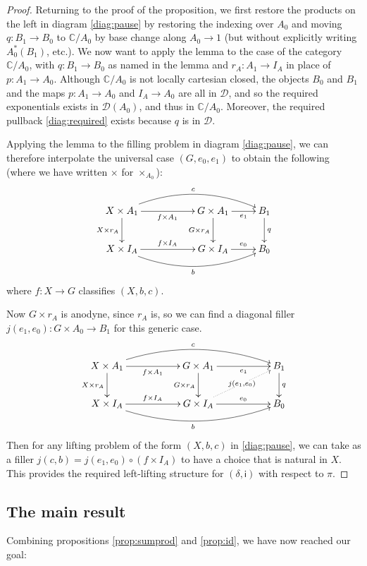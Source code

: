 \documentclass[12pt]{article}
\newcommand{\C}{\ensuremath{\mathbb{C}}}
\newcommand{\D}{\ensuremath{\mathcal{D}}}
\newcommand{\iy}{\mathsf{i}}
\theoremstyle{definition}
\begin{document}
\begin{proof}
Returning to the proof of the proposition, we first restore the products on the left in diagram \eqref{diag:pause} by restoring the indexing over $A_0$ and moving $q : B_1\to B_0$ to $\C/A_0$ by base change along $A_0\to 1$ (but without explicitly writing $A_0^*(B_1)$, etc.).   We now want to apply the lemma to the case of the category $\C/A_0$, with $q: B_1\to B_0$ as named in the lemma and $r_A : A_1 \to I_A$ in place of $p: A_1 \to A_0$.  Although $\C/A_0$ is not locally cartesian closed, the objects $B_0$ and $B_1$ and the maps $p:A_1 \to A_0$ and $I_A\to A_0$ are all in \D, and so the required exponentials exists in $\D(A_0)$, and thus in $\C/A_0$.  Moreover, the required pullback \eqref{diag:required} exists because $q$ is in \D.

Applying the lemma to the filling problem in diagram \eqref{diag:pause}, we can therefore interpolate the universal case $(G, e_0, e_1)$ to obtain the following (where we have written $\times$ for $\times_{A_0}$):
\[
\xymatrix{
X\times A_1 \ar@/^4ex /[rrr]^{c} \ar[d]_{X\times r_A} \ar[rr]_{f\times A_1} &
					& G\times A_1 \ar[d]_{G\times r_A} \ar[r]_-{e_1} & B_1 \ar[d]^{q} \\
X\times I_A   \ar@/_4ex /[rrr]_{b} \ar[rr]^{f\times I_A} &
					& G\times I_A   \ar[r]^-{e_0} & B_0
}
\]
where $f : X \to G$ classifies $(X,b,c)$.

Now $G\times r_A$ is anodyne, since $r_A$ is, so we can find a diagonal filler 
$j(e_1,e_0): G\times A_0 \to B_1$ for  this generic case.  
\[
\xymatrix{
X\times A_1 \ar@/^4ex /[rrrr]^{c} \ar[d]_{X\times r_A} \ar[rr]_{f\times A_1} &
					& G\times A_1 \ar[d]_{G\times r_A} \ar[rr]_-{e_1} && B_1 \ar[d]^{q} \\
X\times I_A   \ar@/_4ex /[rrrr]_{b} \ar[rr]^{f\times I_A} &
					& G\times I_A   \ar[rr]^-{e_0} \ar@{.>}[rru]|-{j(e_1,e_0)} && B_0
}
\] 
Then for any  lifting problem of the form $(X, b, c)$ in \eqref{diag:pause}, we can  take as a filler $j(c,b) = j(e_1,e_0)\circ (f\times I_A)$ to have a  choice that is natural in $X$.  This provides the required left-lifting structure for $(\delta, \iy)$ with respect to $\pi$.
\end{proof}

\subsection{The main result}


Combining propositions \ref{prop:sumprod} and \ref{prop:id}, we have now reached our goal:
\end{document}
